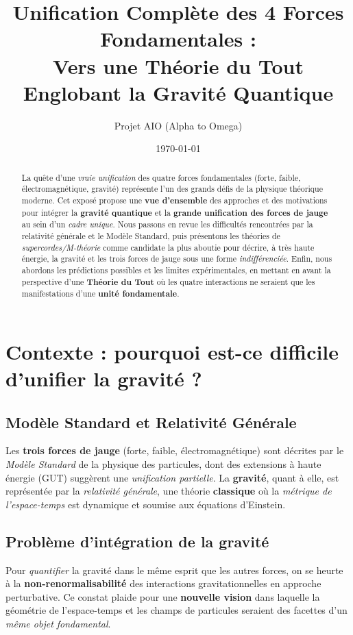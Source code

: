 \documentclass[12pt]{article}
\title{\textbf{Unification Complète des 4 Forces Fondamentales :}\\
Vers une Théorie du Tout Englobant la Gravité Quantique}
\author{Projet AIO (Alpha to Omega)}
\date{\today}
\begin{document}
\maketitle

\begin{abstract}
La quête d'une \emph{vraie unification} des quatre forces fondamentales 
(forte, faible, électromagnétique, gravité) représente l'un des grands défis 
de la physique théorique moderne. Cet exposé propose une \textbf{vue d'ensemble} 
des approches et des motivations pour intégrer la \textbf{gravité quantique} 
et la \textbf{grande unification des forces de jauge} au sein d'un \emph{cadre unique}. 
Nous passons en revue les difficultés rencontrées par la relativité générale 
et le Modèle Standard, puis présentons les théories de \emph{supercordes/M-théorie} 
comme candidate la plus aboutie pour décrire, à très haute énergie, 
la gravité et les trois forces de jauge sous une forme \emph{indifférenciée}. 
Enfin, nous abordons les prédictions possibles et les limites expérimentales, 
en mettant en avant la perspective d'une \textbf{Théorie du Tout} 
où les quatre interactions ne seraient que les \og manifestations \fg{} 
d'une \textbf{unité fondamentale}.
\end{abstract}

\tableofcontents

\section{Contexte : pourquoi est-ce difficile d'unifier la gravité ?}
\label{sec:intro}

\subsection{Modèle Standard et Relativité Générale}
Les \textbf{trois forces de jauge} (forte, faible, électromagnétique) 
sont décrites par le \emph{Modèle Standard} de la physique des particules, 
dont des extensions à haute énergie (GUT) suggèrent une \emph{unification partielle}.  
La \textbf{gravité}, quant à elle, est représentée par la \emph{relativité générale}, 
une théorie \textbf{classique} où la \emph{métrique de l'espace-temps} est dynamique 
et soumise aux équations d'Einstein.

\subsection{Problème d'intégration de la gravité}
Pour \emph{quantifier} la gravité dans le même esprit que les autres forces, 
on se heurte à la \textbf{non-renormalisabilité} des interactions gravitationnelles 
en approche perturbative.  
Ce constat plaide pour une \textbf{nouvelle vision} dans laquelle 
la géométrie de l'espace-temps et les champs de particules seraient 
des \og facettes \fg{} d'un \emph{même objet fondamental}.
\end{document}
